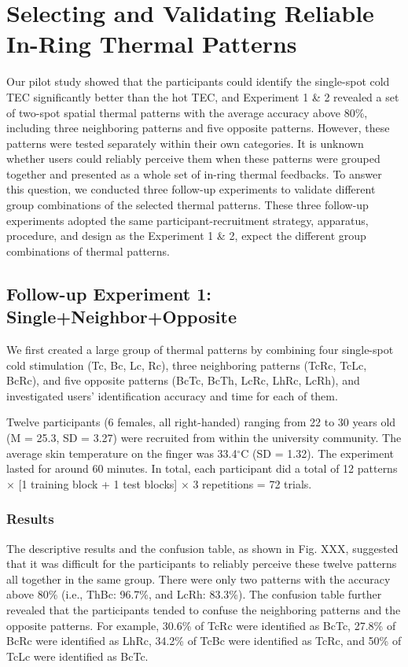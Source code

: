 \documentclass[preprint,12pt]{elsarticle}
\begin{document}
\section{Selecting and Validating Reliable In-Ring Thermal Patterns}
Our pilot study showed that the participants could identify the single-spot cold TEC significantly better than the hot TEC, and Experiment 1 \& 2 revealed a set of two-spot spatial thermal patterns with the average accuracy above 80\%, including three neighboring patterns and five opposite patterns. However, these patterns were tested separately within their own categories. It is unknown whether users could reliably perceive them when these patterns were grouped together and presented as a whole set of in-ring thermal feedbacks. To answer this question, we conducted three follow-up experiments to validate different group combinations of the selected thermal patterns. These three follow-up experiments adopted the same participant-recruitment strategy, apparatus, procedure, and design as the Experiment 1 \& 2, expect the different group combinations of thermal patterns.

\subsection{Follow-up Experiment 1: Single+Neighbor+Opposite}
We first created a large group of thermal patterns by combining four single-spot cold stimulation (Tc, Bc, Lc, Rc), three neighboring patterns (TcRc, TcLc, BcRc), and five opposite patterns (BcTc, BcTh, LcRc, LhRc, LcRh), and investigated users' identification accuracy and time for each of them. 

Twelve participants (6 females, all right-handed) ranging from 22 to 30 years old (M = 25.3, SD = 3.27) were recruited from within the university community. The average skin temperature on the finger was 33.4$^{\circ}$C (SD = 1.32). The experiment lasted for around 60 minutes. In total, each participant did a total of 12 patterns $\times$ [1 training block + 1 test blocks] $\times$ 3 repetitions = 72 trials.

\subsubsection{Results}
The descriptive results and the confusion table, as shown in Fig. XXX, suggested that it was difficult for the participants to reliably perceive these twelve patterns all together in the same group. There were only two patterns with the accuracy above 80\% (i.e., ThBc: 96.7\%, and LcRh: 83.3\%). The confusion table further revealed that the participants tended to confuse the neighboring patterns and the opposite patterns. For example, 30.6\% of TcRc were identified as BcTc, 27.8\% of BcRc were identified as LhRc, 34.2\% of TcBc were identified as TcRc, and 50\% of TcLc were identified as BcTc. 
\end{document}
